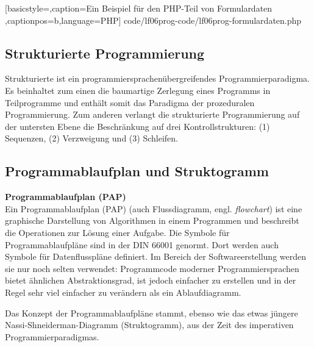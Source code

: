 
	[basicstyle=\small,caption={Ein Beispiel für den PHP-Teil von Formulardaten}
	\label{lst:html-formulardaten},captionpos=b,language=PHP]
	{code/lf06prog-code/lf06prog-formulardaten.php}

\subsection{Strukturierte Programmierung}
Strukturierte ist ein programmiersprachenübergreifendes Programmierparadigma. Es beinhaltet zum einen die baumartige Zerlegung eines Programms in Teilprogramme und enthält somit das Paradigma der prozeduralen Programmierung. Zum anderen verlangt die strukturierte Programmierung auf der untersten Ebene die Beschränkung auf drei Kontrollstrukturen: (1) Sequenzen, (2) Verzweigung und (3) Schleifen.


\subsection{Programmablaufplan und Struktogramm}

{\bf Programmablaufplan (PAP)}~\\

Ein Programmablaufplan (PAP) (auch Flussdiagramm, engl. {\it flowchart}) ist eine graphische Darstellung von Algorithmen in einem Programmen und beschreibt die Operationen zur Lösung einer Aufgabe. Die Symbole für Programmablaufpläne sind in der DIN 66001 genormt. Dort werden auch Symbole für Datenflusspläne definiert. Im Bereich der Softwareerstellung werden sie nur noch selten verwendet: Programmcode moderner Programmiersprachen bietet ähnlichen Abstraktionsgrad, ist jedoch einfacher zu erstellen und in der Regel sehr viel einfacher zu verändern als ein Ablaufdiagramm.

Das Konzept der Programmablaufpläne stammt, ebenso wie das etwas jüngere Nassi-Shneiderman-Diagramm (Struktogramm), aus der Zeit des imperativen
Programmierparadigmas.

